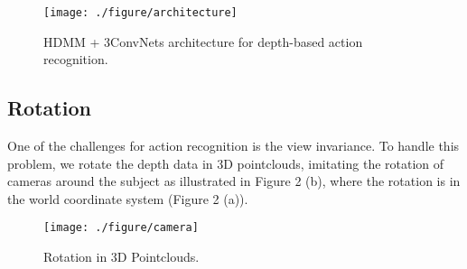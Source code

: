 \documentclass[conference]{IEEEtran}
\begin{document}
\begin{figure*}[!ht]
\begin{center}{\texttt{[image: ./figure/architecture]}}
\end{center}
\caption{HDMM + 3ConvNets architecture for depth-based action recognition.}
\label{fig:framework}
\end{figure*}

\subsection{Rotation}
One of the challenges for action recognition is the view invariance. To handle this problem, we rotate the depth data in 3D pointclouds, imitating the rotation of cameras around the subject as illustrated in Figure 2 (b), where the rotation is in the world coordinate system (Figure 2 (a)).
\begin{figure}[!ht]
\begin{center}{\texttt{[image: ./figure/camera]}}
\end{center}
\caption{Rotation in 3D Pointclouds.}
\label{fig:framework}
\end{figure}
\end{document}
